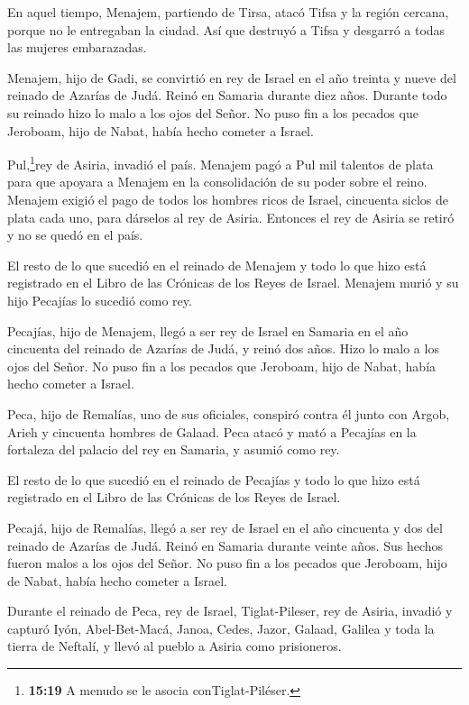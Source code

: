  En aquel tiempo, Menajem, partiendo de Tirsa, atacó Tifsa
y la región cercana, porque no le entregaban la ciudad. Así que destruyó
a Tifsa y desgarró a todas las mujeres embarazadas.

 Menajem, hijo de Gadi, se convirtió en rey de Israel en el
año treinta y nueve del reinado de Azarías de Judá. Reinó en Samaria
durante diez años.  Durante todo su reinado hizo lo malo a
los ojos del Señor. No puso fin a los pecados que Jeroboam, hijo de
Nabat, había hecho cometer a Israel.

 Pul,\footnote{\textbf{15:19} A menudo se le asocia
  conTiglat-Piléser.}rey de Asiria, invadió el país. Menajem pagó a Pul
mil talentos de plata para que apoyara a Menajem en la consolidación de
su poder sobre el reino.  Menajem exigió el pago de todos
los hombres ricos de Israel, cincuenta siclos de plata cada uno, para
dárselos al rey de Asiria. Entonces el rey de Asiria se retiró y no se
quedó en el país.

 El resto de lo que sucedió en el reinado de Menajem y todo
lo que hizo está registrado en el Libro de las Crónicas de los Reyes de
Israel.  Menajem murió y su hijo Pecajías lo sucedió como
rey.

 Pecajías, hijo de Menajem, llegó a ser rey de Israel en
Samaria en el año cincuenta del reinado de Azarías de Judá, y reinó dos
años.  Hizo lo malo a los ojos del Señor. No puso fin a los
pecados que Jeroboam, hijo de Nabat, había hecho cometer a Israel.

 Peca, hijo de Remalías, uno de sus oficiales, conspiró
contra él junto con Argob, Arieh y cincuenta hombres de Galaad. Peca
atacó y mató a Pecajías en la fortaleza del palacio del rey en Samaria,
y asumió como rey.

 El resto de lo que sucedió en el reinado de Pecajías y
todo lo que hizo está registrado en el Libro de las Crónicas de los
Reyes de Israel.

 Pecajá, hijo de Remalías, llegó a ser rey de Israel en el
año cincuenta y dos del reinado de Azarías de Judá. Reinó en Samaria
durante veinte años.  Sus hechos fueron malos a los ojos
del Señor. No puso fin a los pecados que Jeroboam, hijo de Nabat, había
hecho cometer a Israel.

 Durante el reinado de Peca, rey de Israel, Tiglat-Pileser,
rey de Asiria, invadió y capturó Iyón, Abel-Bet-Macá, Janoa, Cedes,
Jazor, Galaad, Galilea y toda la tierra de Neftalí, y llevó al pueblo a
Asiria como prisioneros.

